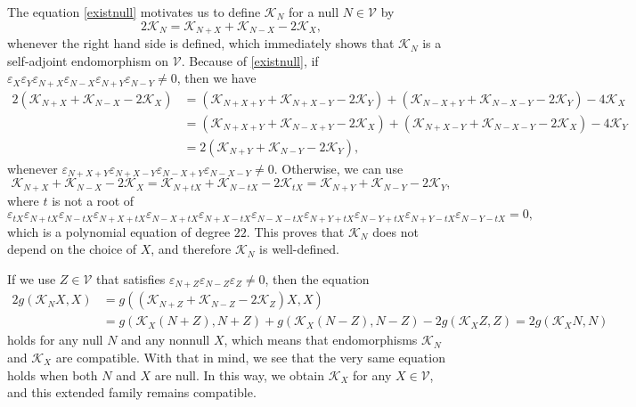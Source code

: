 \documentclass[preprint]{elsarticle}
\newcommand\mc{\mathcal}
\newcommand\ve{\varepsilon}%
\begin{document}
The equation \eqref{existnull} motivates us to define $\mc{K}_N$ for a null $N\in\mc{V}$ by
\begin{equation*}
2\mc{K}_N=\mc{K}_{N+X}+\mc{K}_{N-X}-2\mc{K}_X,
\end{equation*}
whenever the right hand side is defined, which immediately shows that $\mc{K}_N$ is a self-adjoint endomorphism on $\mc{V}$. 
Because of \eqref{existnull}, if $\ve_X\ve_Y\ve_{N+X}\ve_{N-X}\ve_{N+Y}\ve_{N-Y}\neq 0$, then we have
\begin{equation*}
\begin{aligned}
2(\mc{K}_{N+X}+\mc{K}_{N-X}-2\mc{K}_X)&=(\mc{K}_{N+X+Y}+\mc{K}_{N+X-Y}-2\mc{K}_Y)+(\mc{K}_{N-X+Y}+\mc{K}_{N-X-Y}-2\mc{K}_Y)-4\mc{K}_X\\
&=(\mc{K}_{N+X+Y}+\mc{K}_{N-X+Y}-2\mc{K}_X)+(\mc{K}_{N+X-Y}+\mc{K}_{N-X-Y}-2\mc{K}_X)-4\mc{K}_Y\\
&=2(\mc{K}_{N+Y}+\mc{K}_{N-Y}-2\mc{K}_Y),
\end{aligned}
\end{equation*}
whenever $\ve_{N+X+Y}\ve_{N+X-Y}\ve_{N-X+Y}\ve_{N-X-Y}\neq 0$. Otherwise, we can use 
\begin{equation*}
\mc{K}_{N+X}+\mc{K}_{N-X}-2\mc{K}_X= \mc{K}_{N+tX}+\mc{K}_{N-tX}-2\mc{K}_{tX} =\mc{K}_{N+Y}+\mc{K}_{N-Y}-2\mc{K}_Y,
\end{equation*}
where $t$ is not a root of 
\begin{equation*}
\ve_{tX}\ve_{N+tX}\ve_{N-tX}\ve_{N+X+tX}\ve_{N-X+tX}\ve_{N+X-tX}\ve_{N-X-tX}\ve_{N+Y+tX}\ve_{N-Y+tX}\ve_{N+Y-tX}\ve_{N-Y-tX}=0,
\end{equation*}
which is a polynomial equation of degree $22$. 
This proves that $\mc{K}_N$ does not depend on the choice of $X$, and therefore $\mc{K}_N$ is well-defined.

If we use $Z\in\mc{V}$ that satisfies $\ve_{N+Z}\ve_{N-Z}\ve_{Z}\neq 0$, then the equation 
\begin{equation*}
\begin{aligned}
2g(\mc{K}_NX,X)&=g((\mc{K}_{N+Z}+\mc{K}_{N-Z}-2\mc{K}_Z)X,X)\\
&=g(\mc{K}_X(N+Z),N+Z)+g(\mc{K}_X(N-Z),N-Z)-2g(\mc{K}_XZ,Z)=2g(\mc{K}_XN,N)
\end{aligned}
\end{equation*}
holds for any null $N$ and any nonnull $X$, which means that endomorphisms $\mc{K}_N$ and $\mc{K}_X$ are compatible.
With that in mind, we see that the very same equation holds when both $N$ and $X$ are null.
In this way, we obtain $\mc{K}_X$ for any $X\in\mc{V}$, and this extended family remains compatible. 
\end{document}
